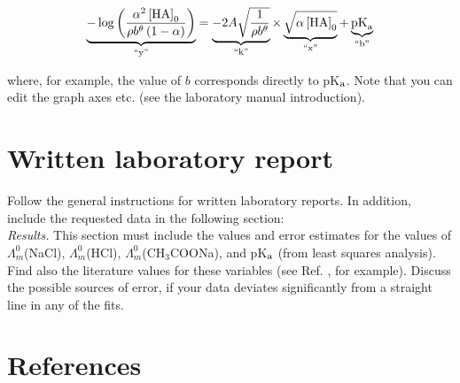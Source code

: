 \documentclass[byrevtex,amssymb,aps,pra,floatfix,letterpaper]{revtex4}
\begin{document}
\begin{enumerate}
\begin{equation}
\label{eq27}
\underbrace{-\log\left(\frac{\alpha^2\left[\textnormal{HA}\right]_0}{\rho b^\theta\left(1 - \alpha\right)}\right)}_\textnormal{``y''} = \underbrace{-2A\sqrt{\frac{1}{\rho b^\theta}}}_\textnormal{``k''}\times\underbrace{\sqrt{\alpha\left[\textnormal{HA}\right]_0}}_\textnormal{``x''} + \underbrace{\textnormal{pK}_\textnormal{a}}_\textnormal{``b''}
\end{equation}

\noindent
where, for example, the value of $b$ corresponds directly to pK$_\textnormal{a}$. Note that you can edit the graph axes etc. (see the laboratory manual introduction).

\end{enumerate}

\section{Written laboratory report}

Follow the general instructions for written laboratory reports. In addition, include the requested data in the following section:\\

\noindent
\textit{Results.} This section must include the values and error estimates for the values of $\Lambda^0_m$(NaCl), $\Lambda^0_m$(HCl), $\Lambda^0_m$(CH$_3$COONa), and pK$_\textnormal{a}$ (from least squares analysis). Find also the literature values for these variables (see Ref. \cite{ATKINS1}, for example). Discuss the possible sources of error, if your data deviates significantly from a straight line in any of the fits.

\section{References}

\vspace{-1cm}


\end{document}

